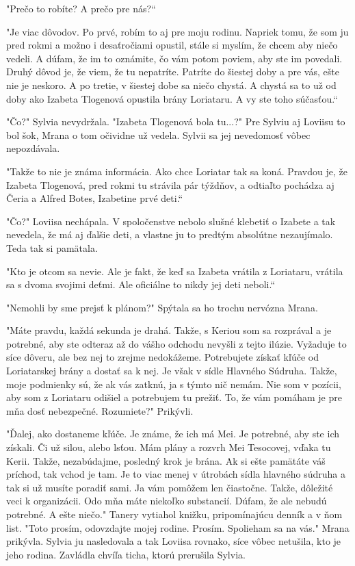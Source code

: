 \documentclass{book}
\begin{document}
"$ $Prečo to robíte? A prečo pre nás?“

"$ $Je viac dôvodov. Po prvé, robím to aj pre moju rodinu. Napriek tomu, že som ju pred rokmi a možno i desaťročiami opustil, stále si myslím, že chcem aby niečo vedeli. A dúfam, že im to oznámite, čo vám potom poviem, aby ste im povedali. Druhý dôvod je, že viem, že tu nepatríte. Patríte do šiestej doby a pre vás, ešte nie je neskoro. A po tretie, v šiestej dobe sa niečo chystá. A chystá sa to už od doby ako Izabeta Tlogenová opustila brány Loriataru. A vy ste toho súčasťou.“

"$ $Čo?"$ $ Sylvia nevydržala. "$ $Izabeta Tlogenová bola tu...?"$ $ Pre Sylviu aj Loviisu to bol šok, Mrana o tom očividne už vedela. Sylvii sa jej nevedomosť vôbec nepozdávala.

"$ $Takže to nie je známa informácia. Ako chce Loriatar tak sa koná. Pravdou je, že Izabeta Tlogenová, pred rokmi tu strávila pár týždňov, a odtiaľto pochádza aj Čeria a Alfred Botes, Izabetine prvé deti.“

"$ $Čo?"$ $ Loviisa nechápala. V spoločenstve nebolo slušné klebetiť o Izabete a tak nevedela, že má aj ďalšie deti, a vlastne ju to predtým absolútne nezaujímalo. Teda tak si pamätala.

"$ $Kto je otcom sa nevie. Ale je fakt, že keď sa Izabeta vrátila z Loriataru, vrátila sa s dvoma svojimi deťmi. Ale oficiálne to nikdy jej deti neboli.“

"$ $Nemohli by sme prejsť k plánom?"$ $ Spýtala sa ho trochu nervózna Mrana.

"$ $Máte pravdu, každá sekunda je drahá. Takže, s Keriou som sa rozprával a je potrebné, aby ste odteraz až do vášho odchodu nevyšli z tejto ilúzie. Vyžaduje to síce dôveru, ale bez nej to zrejme nedokážeme. Potrebujete získať kľúče od Loriatarskej brány a dostať sa k nej. Je však v sídle Hlavného Súdruha. Takže, moje podmienky sú, že ak vás zatknú, ja s týmto nič nemám. Nie som v pozícii, aby som z Loriataru odišiel a potrebujem tu prežiť. To, že vám pomáham je pre mňa dosť nebezpečné. Rozumiete?"$ $ Prikývli.

"$ $Ďalej, ako dostaneme kľúče. Je známe, že ich má Mei. Je potrebné, aby ste ich získali. Či už silou, alebo lsťou. Mám plány a rozvrh Mei Tesocovej, vďaka tu Kerii.  Takže, nezabúdajme, posledný krok je brána. Ak si ešte pamätáte váš príchod, tak vchod je tam. Je to viac menej v útrobách sídla hlavného súdruha a tak si už musíte poradiť sami. Ja vám pomôžem len čiastočne. Takže, dôležité veci k organizácii. Odo mňa máte niekoľko substancií. Dúfam, že ale nebudú potrebné. A ešte niečo."$ $ Tanery vytiahol knižku, pripomínajúcu denník a v ňom list. "$ $Toto prosím, odovzdajte mojej rodine. Prosím. Spolieham sa na vás."$ $ Mrana prikývla. Sylvia ju nasledovala a tak Loviisa rovnako, síce vôbec netušila, kto je jeho rodina. Zavládla chvíľa ticha, ktorú prerušila Sylvia.
\end{document}
